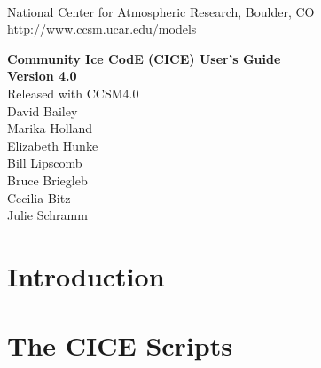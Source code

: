 \documentclass[]{article}
\newif\ifpdf
\begin{document}
\ifpdf
\else
{}
\fi

 \newenvironment{Ventry}[1]%
   {\begin{list}{}{\renewcommand{\makelabel}[1]{\textsf{##1:}\hfil}%
      \settowidth{\labelwidth}{\textsf{#1:}}%
      \setlength{\leftmargin}{1.5cm}%
      \setlength{\labelwidth}{1.0cm}%
      \setlength{\itemsep}{0pt}%
      \setlength{\parsep}{0pt}}}%
   {\end{list}}

\begin{titlepage}

 \\
\noindent National Center for Atmospheric Research, Boulder, CO \\
\noindent http://www.ccsm.ucar.edu/models \\
\vspace{2in}

\begin{center}
{\Large
  {\bf Community Ice CodE (CICE) User's Guide} \\
  {\bf Version 4.0} \\
  \vspace{0.2in}
  {Released with CCSM4.0} \\
  \vspace{0.5in}
  David Bailey \\
  Marika Holland \\
  Elizabeth Hunke \\
  Bill Lipscomb \\
  Bruce Briegleb \\
  Cecilia Bitz  \\
  Julie Schramm \\
}
\end{center}

\end{titlepage}

\tableofcontents

\newpage
\section{Introduction}
  

\section{The CICE Scripts}
    
\end{document}
